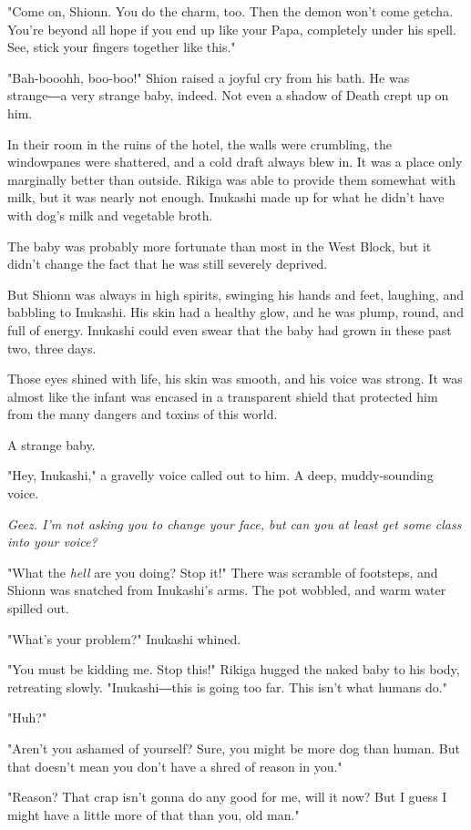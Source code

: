 "Come on, Shionn. You do the charm, too. Then the demon won't come
getcha. You're beyond all hope if you end up like your Papa, completely
under his spell. See, stick your fingers together like this."

"Bah-booohh, boo-boo!" Shion raised a joyful cry from his bath. He was
strange―a very strange baby, indeed. Not even a shadow of Death crept up
on him.

In their room in the ruins of the hotel, the walls were crumbling, the
windowpanes were shattered, and a cold draft always blew in. It was a
place only marginally better than outside. Rikiga was able to provide
them somewhat with milk, but it was nearly not enough. Inukashi made up
for what he didn't have with dog's milk and vegetable broth.

The baby was probably more fortunate than most in the West Block, but it
didn't change the fact that he was still severely deprived.

But Shionn was always in high spirits, swinging his hands and feet,
laughing, and babbling to Inukashi. His skin had a healthy glow, and he
was plump, round, and full of energy. Inukashi could even swear that the
baby had grown in these past two, three days.

Those eyes shined with life, his skin was smooth, and his voice was
strong. It was almost like the infant was encased in a transparent
shield that protected him from the many dangers and toxins of this
world.

A strange baby.

"Hey, Inukashi," a gravelly voice called out to him. A deep,
muddy-sounding voice.

\emph{Geez. I'm not asking you to change your face, but can you at least get
some class into your voice?}

"What the \emph{hell} are you doing? Stop it!" There was scramble of footsteps,
and Shionn was snatched from Inukashi's arms. The pot wobbled, and warm
water spilled out.

"What's your problem?" Inukashi whined.

"You must be kidding me. Stop this!" Rikiga hugged the naked baby to his
body, retreating slowly. "Inukashi―this is going too far. This isn't
what humans do."

"Huh?"

"Aren't you ashamed of yourself? Sure, you might be more dog than human.
But that doesn't mean you don't have a shred of reason in you."

"Reason? That crap isn't gonna do any good for me, will it now? But I
guess I might have a little more of that than you, old man."

